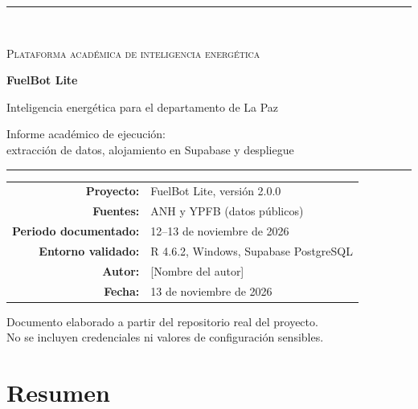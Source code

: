 \documentclass[12pt,a4paper]{article}
\begin{document}
\begin{titlepage}
\centering
\vspace*{1.2cm}

{\color{fbdeep}\rule{\linewidth}{1.2pt}}\\[0.5cm]
{\Large\scshape Plataforma académica de inteligencia energética\par}
\vspace{1.0cm}

{\Huge\bfseries FuelBot Lite\par}
\vspace{0.45cm}
{\LARGE Inteligencia energética para el departamento de La Paz\par}
\vspace{0.8cm}

{\Large Informe académico de ejecución:\\[0.18cm]
extracción de datos, alojamiento en Supabase y despliegue\par}
\vspace{0.4cm}
{\color{fbdeep}\rule{\linewidth}{1.2pt}}

\vfill

\begin{tabular}{rl}
\textbf{Proyecto:} & FuelBot Lite, versión 2.0.0\\
\textbf{Fuentes:} & ANH y YPFB (datos públicos)\\
\textbf{Periodo documentado:} & 12--13 de noviembre de 2026\\
\textbf{Entorno validado:} & R 4.6.2, Windows, Supabase PostgreSQL\\
\textbf{Autor:} & [Nombre del autor]\\
\textbf{Fecha:} & 13 de noviembre de 2026\\
\end{tabular}

\vfill
{\small Documento elaborado a partir del repositorio real del proyecto.\\
No se incluyen credenciales ni valores de configuración sensibles.}
\end{titlepage}

\section*{Resumen}
\end{document}
